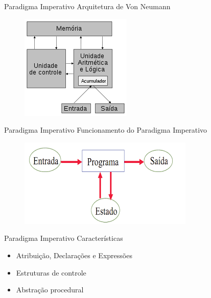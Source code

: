 \documentclass{beamer}
\begin{document}
\begin{frame}{Paradigma Imperativo}
Arquitetura de Von Neumann
  \begin{figure}
    \centering
    \includegraphics[scale=0.7]{von.png}
    \label{Rótulo}
  \end{figure}
\end{frame}

\begin{frame}{Paradigma Imperativo}
Funcionamento do Paradigma Imperativo
    \begin{figure}
            \centering
            \includegraphics[scale=0.8]{paradigma.png}
            \label{Rótulo}
        \end{figure}
\end{frame}

\begin{frame}{Paradigma Imperativo}
Características
    \begin{itemize}
        \item{Atribuição, Declarações e Expressões}
        \item{Estruturas de controle}
        \item{Abstração procedural}
    \end{itemize}
\end{frame}



\appendix
\section{\appendixname}
\end{document}

